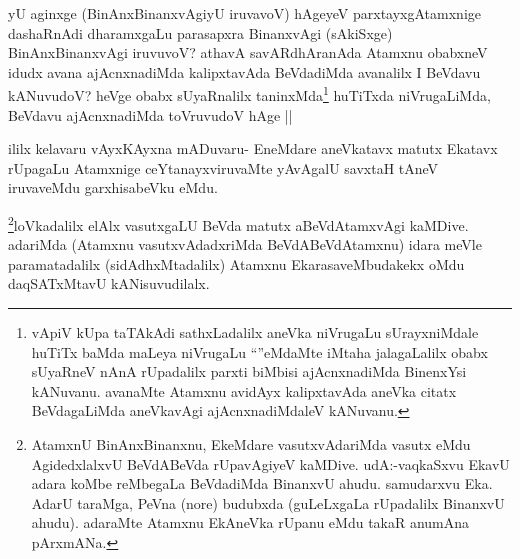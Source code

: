 
\begin{artha}
yU aginxge (BinAnxBinanxvAgiyU iruvavoV) hAgeyeV parxtayxgAtamxnige dashaRnAdi dharamxgaLu parasapxra BinanxvAgi (sAkiSxge) BinAnxBinanxvAgi iruvuvoV? athavA savARdhAranAda Atamxnu obabxneV idudx avana ajAcnxnadiMda kalipxtavAda BeVdadiMda avanalilx I BeVdavu kANuvudoV? heVge obabx sUyaRnalilx taninxMda\footnote{vApiV kUpa taTAkAdi sathxLadalilx aneVka niVrugaLu sUrayxniMdale huTiTx baMda maLeya niVrugaLu ``\stext''eMdaMte iMtaha jalagaLalilx obabx sUyaRneV nAnA rUpadalilx parxti biMbisi ajAcnxnadiMda BinenxYsi kANuvanu. avanaMte Atamxnu avidAyx kalipxtavAda aneVka citatx BeVdagaLiMda aneVkavAgi ajAcnxnadiMdaleV kANuvanu.} huTiTxda niVrugaLiMda, BeVdavu ajAcnxnadiMda toVruvudoV hAge ||
\end{artha}


\begin{artha}
ililx kelavaru vAyxKAyxna mADuvaru- EneMdare aneVkatavx matutx Ekatavx rUpagaLu Atamxnige ceYtanayxviruvaMte yAvAgalU savxtaH tAneV iruvaveMdu garxhisabeVku eMdu.
\end{artha}


\begin{artha}
\footnote{AtamxnU BinAnxBinanxnu, EkeMdare vasutxvAdariMda vasutx eMdu AgidedxlalxvU BeVdABeVda rUpavAgiyeV kaMDive. udA:-vaqkaSxvu EkavU adara koMbe reMbegaLa BeVdadiMda BinanxvU ahudu. samudarxvu Eka. AdarU taraMga, PeVna (nore) budubxda (guLeLxgaLa rUpadalilx BinanxvU ahudu). adaraMte Atamxnu EkAneVka rUpanu eMdu takaR anumAna pArxmANa.}loVkadalilx elAlx vasutxgaLU BeVda matutx aBeVdAtamxvAgi kaMDive. adariMda (Atamxnu vasutxvAdadxriMda BeVdABeVdAtamxnu) idara meVle paramatadalilx (sidAdhxMtadalilx) Atamxnu EkarasaveMbudakekx oMdu daqSATxMtavU kANisuvudilalx.
\end{artha}

